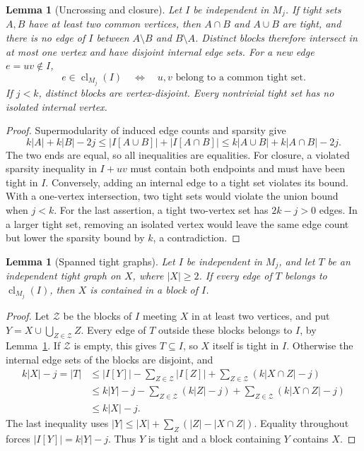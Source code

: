 \documentclass[11pt,a4paper]{article}
\newtheorem{lemma}[theorem]{Lemma}
\theoremstyle{definition}
\theoremstyle{remark}
\newcommand{\clj}[2]{\operatorname{cl}_{M_{#1}}(#2)}
\begin{document}
\begin{lemma}[Uncrossing and closure]\label{lem:uncross}
Let $I$ be independent in $M_j$. If tight sets $A,B$ have at
least two common vertices, then $A\cap B$ and $A\cup B$ are tight,
and there is no edge of $I$ between $A\setminus B$ and
$B\setminus A$. Distinct blocks therefore intersect in at most
one vertex and have disjoint internal edge sets.
For a new edge $e=uv\notin I$,
\[
 e\in\clj jI
 \quad\Longleftrightarrow\quad
 u,v\text{ belong to a common tight set}.
\]
If $j<k$, distinct blocks are vertex-disjoint.
Every nontrivial tight set has no isolated internal vertex.
\end{lemma}
\begin{proof}
Supermodularity of induced edge counts and sparsity give
\[
 k|A|+k|B|-2j
 \leq |I[A\cup B]|+|I[A\cap B]|
 \leq k|A\cup B|+k|A\cap B|-2j.
\]
The two ends are equal, so all inequalities are equalities.
For closure, a violated sparsity inequality in $I+uv$ must
contain both endpoints and must have been tight in $I$.
Conversely, adding an internal edge to a tight set violates its
bound. With a one-vertex intersection, two tight sets would
violate the union bound when $j<k$.
For the last assertion, a tight two-vertex set has
$2k-j>0$ edges. In a larger tight set, removing an isolated
vertex would leave the same edge count but lower the sparsity
bound by $k$, a contradiction.
\end{proof}

\begin{lemma}[Spanned tight graphs]\label{lem:spanned-tight}
Let $I$ be independent in $M_j$, and let $T$ be an independent
tight graph on $X$, where $|X|\geq2$. If every edge of $T$ belongs
to $\clj jI$, then $X$ is contained in a block of $I$.
\end{lemma}
\begin{proof}
Let $\mathcal Z$ be the blocks of $I$ meeting $X$ in at least two
vertices, and put $Y=X\cup\bigcup_{Z\in\mathcal Z}Z$.
Every edge of $T$ outside these blocks belongs to $I$, by
Lemma~\ref{lem:uncross}. If $\mathcal Z$ is empty, this gives
$T\subseteq I$, so $X$ itself is tight in $I$.
Otherwise the internal edge sets of the blocks are disjoint, and
\begin{align*}
 k|X|-j=|T|
 &\leq |I[Y]|-\sum_{Z\in\mathcal Z}|I[Z]|
       +\sum_{Z\in\mathcal Z}(k|X\cap Z|-j)\\
 &\leq k|Y|-j-\sum_{Z\in\mathcal Z}(k|Z|-j)
       +\sum_{Z\in\mathcal Z}(k|X\cap Z|-j)\\
 &\leq k|X|-j.
\end{align*}
The last inequality uses
$|Y|\leq |X|+\sum_Z(|Z|-|X\cap Z|)$.
Equality throughout forces $|I[Y]|=k|Y|-j$.
Thus $Y$ is tight and a block containing $Y$ contains $X$.
\end{proof}
\end{document}
